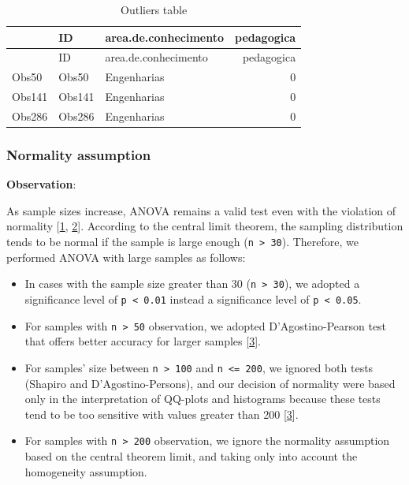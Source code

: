 \documentclass[]{article}
\newenvironment{Shaded}{\begin{snugshade}}{\end{snugshade}}
\newcommand{\CommentTok}[1]{\textcolor[rgb]{0.56,0.35,0.01}{\textit{#1}}}
\newcommand{\KeywordTok}[1]{\textcolor[rgb]{0.13,0.29,0.53}{\textbf{#1}}}
\newcommand{\NormalTok}[1]{#1}
\newcommand{\OperatorTok}[1]{\textcolor[rgb]{0.81,0.36,0.00}{\textbf{#1}}}
\newcommand{\StringTok}[1]{\textcolor[rgb]{0.31,0.60,0.02}{#1}}
\begin{document}
\begin{Shaded}
\end{Shaded}

\begin{longtable}[]{@{}lllr@{}}
\caption{Outliers table}\tabularnewline
\toprule
& ID & area.de.conhecimento & pedagogica\tabularnewline
\midrule
\endfirsthead
\toprule
& ID & area.de.conhecimento & pedagogica\tabularnewline
\midrule
\endhead
Obs50 & Obs50 & Engenharias & 0\tabularnewline
Obs141 & Obs141 & Engenharias & 0\tabularnewline
Obs286 & Obs286 & Engenharias & 0\tabularnewline
\bottomrule
\end{longtable}

\hypertarget{normality-assumption}{%
\subsubsection{Normality assumption}\label{normality-assumption}}

\textbf{Observation}:

As sample sizes increase, ANOVA remains a valid test even with the
violation of normality {[}\protect\hyperlink{references}{1},
\protect\hyperlink{references}{2}{]}. According to the central limit
theorem, the sampling distribution tends to be normal if the sample is
large enough (\texttt{n\ \textgreater{}\ 30}). Therefore, we performed
ANOVA with large samples as follows:

\begin{itemize}
\item
  In cases with the sample size greater than 30
  (\texttt{n\ \textgreater{}\ 30}), we adopted a significance level of
  \texttt{p\ \textless{}\ 0.01} instead a significance level of
  \texttt{p\ \textless{}\ 0.05}.
\item
  For samples with \texttt{n\ \textgreater{}\ 50} observation, we
  adopted D'Agostino-Pearson test that offers better accuracy for larger
  samples {[}\protect\hyperlink{references}{3}{]}.
\item
  For samples' size between \texttt{n\ \textgreater{}\ 100} and
  \texttt{n\ \textless{}=\ 200}, we ignored both tests (Shapiro and
  D'Agostino-Persons), and our decision of normality were based only in
  the interpretation of QQ-plots and histograms because these tests tend
  to be too sensitive with values greater than 200
  {[}\protect\hyperlink{references}{3}{]}.
\item
  For samples with \texttt{n\ \textgreater{}\ 200} observation, we
  ignore the normality assumption based on the central theorem limit,
  and taking only into account the homogeneity assumption.
\end{itemize}
\end{document}
